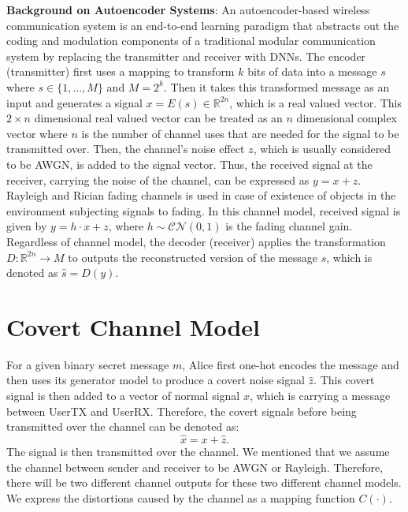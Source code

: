 \textbf{Background on Autoencoder Systems}: An autoencoder-based wireless communication system is an end-to-end learning paradigm that abstracts out the coding and modulation components of a  traditional modular communication system by replacing the transmitter and receiver with DNNs. The encoder (transmitter) first uses a mapping to transform \(k\) bits of data into a message \(s\) where \(s \in \{1,...,M\}\) and \(M = 2^k\). Then it takes this transformed message as an input and generates a signal \(x = E(s) \in \mathbb{R}^{2n}\), which is a real valued vector. This \(2 \times n\) dimensional real valued vector can be treated as an \(n\) dimensional complex vector where \(n\) is the number of channel uses that are needed for the signal to be transmitted over. Then, the channel's noise effect \(z\), which is usually considered to be AWGN, is added to the signal vector. Thus, the received signal at the receiver, carrying the noise of the channel, can be expressed as \(y = x + z\). Rayleigh and Rician fading channels is used in case of existence of objects in the environment subjecting signals to fading. In this channel model, received signal is given by \(y = h \cdot x + z\), where \(h \sim \mathcal{CN}(0, 1)\) is the fading channel gain. Regardless of channel model, the decoder (receiver) applies the transformation \(D: \mathbb{R}^{2n} \rightarrow M \) to outputs the reconstructed version of the message \(s\), which is denoted as \(\hat{s} = D(y)\).

\section{Covert Channel Model}
For a given binary secret message \(m\), Alice first one-hot encodes the message and then uses its generator model to produce a covert noise signal \(\hat{z}\). This covert signal is then added to a vector of normal signal \(x\), which is carrying a message between UserTX and UserRX. Therefore, the covert signals before being transmitted over the channel can be denoted as:
\begin{equation}
	\hat{x} = x + \hat{z}.
\end{equation}
The signal is then transmitted over the channel. We mentioned that we assume the channel between sender and receiver to be AWGN or Rayleigh. Therefore, there will be two different channel outputs for these two different channel models. We express the distortions caused by the channel as a mapping function \(C(\cdot)\).\\


